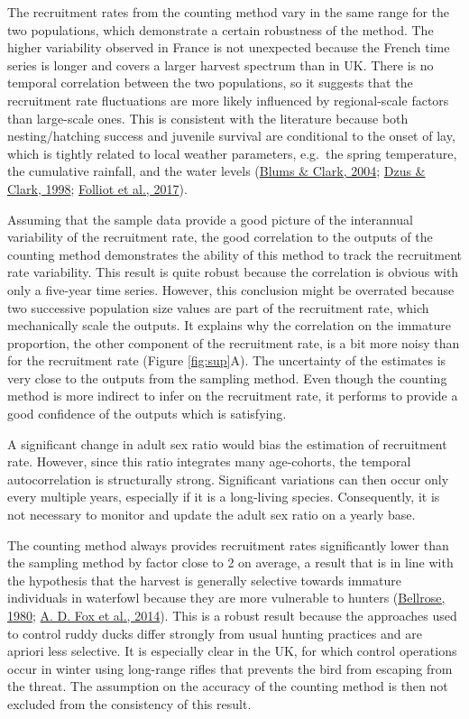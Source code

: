 \documentclass[
  english,
]{article}
\begin{document}
The recruitment rates from the counting method vary in the same range for the two populations, which demonstrate a certain robustness of the method. The higher variability observed in France is not unexpected because the French time series is longer and covers a larger harvest spectrum than in UK. There is no temporal correlation between the two populations, so it suggests that the recruitment rate fluctuations are more likely influenced by regional-scale factors than large-scale ones. This is consistent with the literature because both nesting/hatching success and juvenile survival are conditional to the onset of lay, which is tightly related to local weather parameters, e.g.~the spring temperature, the cumulative rainfall, and the water levels (\protect\hyperlink{ref-Blums2004}{Blums \& Clark, 2004}; \protect\hyperlink{ref-Dzus1998}{Dzus \& Clark, 1998}; \protect\hyperlink{ref-Folliot2017}{Folliot et al., 2017}).

Assuming that the sample data provide a good picture of the interannual variability of the recruitment rate, the good correlation to the outputs of the counting method demonstrates the ability of this method to track the recruitment rate variability. This result is quite robust because the correlation is obvious with only a five-year time series. However, this conclusion might be overrated because two successive population size values are part of the recruitment rate, which mechanically scale the outputs. It explains why the correlation on the immature proportion, the other component of the recruitment rate, is a bit more noisy than for the recruitment rate (Figure \ref{fig:sup}A). The uncertainty of the estimates is very close to the outputs from the sampling method. Even though the counting method is more indirect to infer on the recruitment rate, it performs to provide a good confidence of the outputs which is satisfying.

A significant change in adult sex ratio would bias the estimation of recruitment rate. However, since this ratio integrates many age-cohorts, the temporal autocorrelation is structurally strong. Significant variations can then occur only every multiple years, especially if it is a long-living species. Consequently, it is not necessary to monitor and update the adult sex ratio on a yearly base.

The counting method always provides recruitment rates significantly lower than the sampling method by factor close to 2 on average, a result that is in line with the hypothesis that the harvest is generally selective towards immature individuals in waterfowl because they are more vulnerable to hunters (\protect\hyperlink{ref-Bellrose1980}{Bellrose, 1980}; \protect\hyperlink{ref-Fox2014}{A. D. Fox et al., 2014}). This is a robust result because the approaches used to control ruddy ducks differ strongly from usual hunting practices and are apriori less selective. It is especially clear in the UK, for which control operations occur in winter using long-range rifles that prevents the bird from escaping from the threat. The assumption on the accuracy of the counting method is then not excluded from the consistency of this result.
\end{document}
